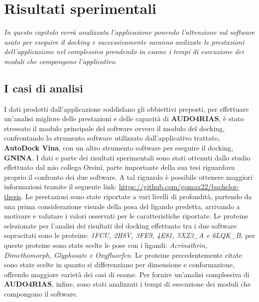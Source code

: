 \chapter{Risultati sperimentali}
\textit{In questo capitolo verrà analizzata l'applicazione ponendo l'attenzione sul software usato per eseguire il docking e successivamente saranno anilzzate le prestazioni dell'applicazione nel complessivo prendendo in esame i tempi di esecuzione dei moduli che compongono l'applicativo.}

\vskip 1cm

\section{I casi di analisi}
I dati prodotti dall'applicazione soddisfano gli obbiettivi preposti, per effettuare un'analisi migliore delle prestazioni e delle capacità di \textbf{AUDO4RIAS}, è stato stressato il modulo principale del software ovvero il modulo del docking, confrontando lo strumento software utilizzato dall'applicativo trattato, \textbf{AutoDock Vina}, con un altro strumento software per eseguire il docking, \textbf{GNINA}.\newline
I dati e parte dei risultati sperimentali sono stati ottenuti dallo studio effettuato dal mio collega Orsini, parte importante della sua tesi riguardava proprio il confronto dei due software. A tal riguardo è possibile ottenere maggiori informazioni tramite il seguente link: \url{https://github.com/gomax22/bachelor-thesis}.\newline
Le prestazioni sono state riportate a vari livelli di profondità, partendo da una prima considerazione visuale della posa del ligando predetta, arrivando a motivare e valutare i valori osservati per le caratteristiche riportate. Le proteine selezionate per l’analisi dei risultati del docking effettuato tra i due software sopracitati sono le proteine: \textit{1FCU, 2H8V, 3FE9, 4E81, 5XZ3\_A e 6LQK\_B}, per queste proteine sono state scelte le pose con i ligandi: \textit{Acrinathrin, Dimethomorph, Glyphosate e Oxyfluorfen}.\newline
Le proteine precedentemente citate sono state scelte in quanto si differenziano per dimensione e conformazione, offrendo maggiore varietà dei casi di esame.\newline
Per fornire un'analisi complessiva di \textbf{AUDO4RIAS}, infine, sono stati analizzati i tempi di esecuzione dei moduli che compongono il software.

